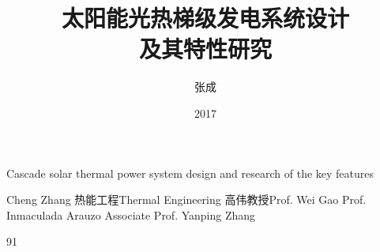 \makenomenclature

\title{太阳能光热梯级发电系统设计\\及其特性研究}{Cascade solar thermal power system design and research of the key features}
\author
{张成}{Cheng Zhang}
\major
{热能工程}{Thermal Engineering}
\supervisor
{高伟\hspace{0.2em}教授}{Prof. Wei Gao \newline Prof. Inmaculada Arauzo \newline Associate Prof. Yanping Zhang}
\date{2017}{9}{1}